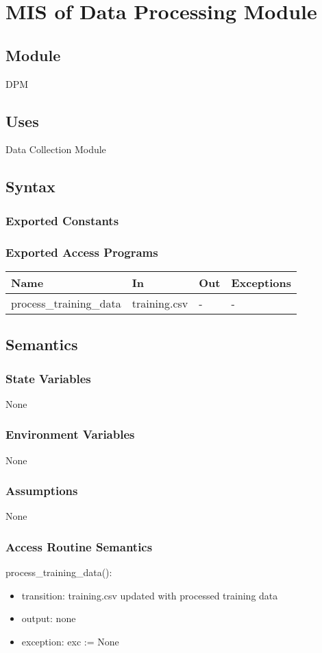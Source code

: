 \documentclass[12pt, titlepage]{article}
\begin{document}
\section{MIS of Data Processing Module} \label{Module} 
\subsection{Module}
DPM
\subsection{Uses}
Data Collection Module
\subsection{Syntax}
\subsubsection{Exported Constants}
\subsubsection{Exported Access Programs}
\begin{center}
\begin{tabular}{p{5cm} p{3cm} p{2cm} p{2cm}}
\hline
\textbf{Name} & \textbf{In} & \textbf{Out} & \textbf{Exceptions} \\
\hline
process\_training\_data & training.csv & - & - \\
\hline
\end{tabular}
\end{center}
\subsection{Semantics}
\subsubsection{State Variables}
None
\subsubsection{Environment Variables}
None
\subsubsection{Assumptions}
None
\subsubsection{Access Routine Semantics}
\noindent process\_training\_data():
\begin{itemize}
    \item transition: training.csv updated with processed training data
    \item output: none
    \item exception: exc := None
\end{itemize}
\end{document}
